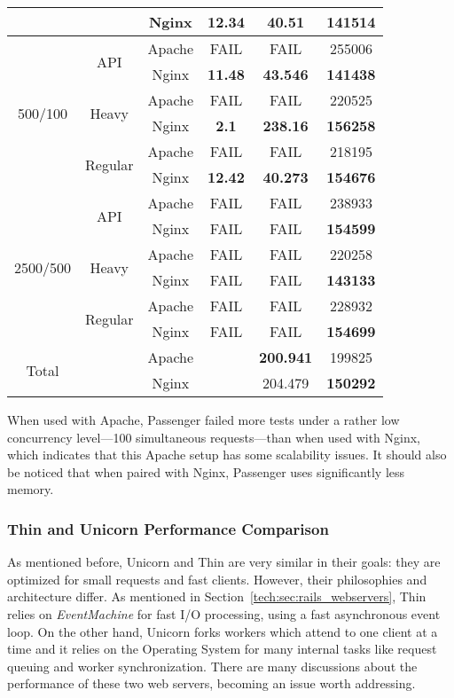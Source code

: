 \begin{table}[h!t]
\begin{tabular}{c|c|c|c|c|c}
     &  & Nginx & 12.34 & 40.51 & \textbf{141514}\\\hline
    \multirow{6}{*}{500/100} & \multirow{2}{*}{API} & Apache & FAIL & FAIL & 255006\\\cline{3-6}
     &  & Nginx & \textbf{11.48} & \textbf{43.546} & \textbf{141438}\\\cline{2-6}
     & \multirow{2}{*}{Heavy} & Apache & FAIL & FAIL & 220525\\\cline{3-6}
     &  & Nginx & \textbf{2.1} & \textbf{238.16} & \textbf{156258}\\\cline{2-6}
     & \multirow{2}{*}{Regular} & Apache & FAIL & FAIL & 218195\\\cline{3-6}
     &  & Nginx & \textbf{12.42} & \textbf{40.273} & \textbf{154676}\\\hline
    \multirow{6}{*}{2500/500} & \multirow{2}{*}{API} & Apache & FAIL & FAIL & 238933\\\cline{3-6}
     &  & Nginx & FAIL & FAIL & \textbf{154599}\\\cline{2-6}
     & \multirow{2}{*}{Heavy} & Apache & FAIL & FAIL & 220258\\\cline{3-6}
     &  & Nginx & FAIL & FAIL & \textbf{143133}\\\cline{2-6}
     & \multirow{2}{*}{Regular} & Apache & FAIL & FAIL & 228932\\\cline{3-6}
     &  & Nginx & FAIL & FAIL & \textbf{154699}\\\hline
    \multirow{2}{*}{Total} &  & Apache &  & \textbf{200.941} & 199825\\\cline{2-6}
     &  & Nginx &  & 204.479 & \textbf{150292}\\
  \end{tabular}
\end{table}

When used with Apache, Passenger failed more tests under a rather low concurrency level---100 simultaneous requests---than when used with Nginx, which indicates that this Apache setup has some scalability issues. It should also be noticed that when paired with Nginx, Passenger uses significantly less memory. 

\subsubsection{Thin and Unicorn Performance Comparison}
As mentioned before, Unicorn and Thin are very similar in their goals: they are optimized for small requests and fast clients. However, their philosophies and architecture differ. As mentioned in Section~\ref{tech:sec:rails_webservers}, Thin relies on \textit{EventMachine} for fast I/O processing, using a fast asynchronous event loop. On the other hand, Unicorn forks workers which attend to one client at a time and it relies on the Operating System for many internal tasks like request queuing and worker synchronization. There are many discussions about the performance of these two web servers, becoming an issue worth addressing.

